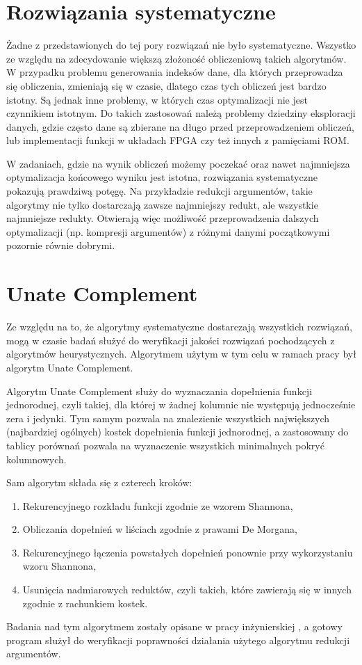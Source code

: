 \section{Rozwiązania systematyczne}

Żadne z przedstawionych do tej pory rozwiązań nie było systematyczne.
Wszystko ze względu na zdecydowanie większą złożoność obliczeniową takich algorytmów.
W przypadku problemu generowania indeksów dane,
dla których przeprowadza się obliczenia,
zmieniają się w czasie,
dlatego czas tych obliczeń jest bardzo istotny.
Są jednak inne problemy,
w których czas optymalizacji nie jest czynnikiem istotnym.
Do takich zastosowań należą problemy dziedziny eksploracji danych,
gdzie często dane są zbierane na długo przed przeprowadzeniem obliczeń,
lub implementacji funkcji w układach FPGA czy też innych z pamięciami ROM.

W zadaniach, gdzie na wynik obliczeń możemy poczekać oraz nawet najmniejsza optymalizacja końcowego wyniku jest istotna,
rozwiązania systematyczne pokazują prawdziwą potęgę.
Na przykładzie redukcji argumentów,
takie algorytmy nie tylko dostarczają zawsze najmniejszy redukt,
ale wszystkie najmniejsze redukty.
Otwierają więc możliwość przeprowadzenia dalszych optymalizacji (np. kompresji argumentów) z różnymi danymi początkowymi pozornie równie dobrymi.

\section{Unate Complement}

Ze względu na to,
że algorytmy systematyczne dostarczają wszystkich rozwiązań,
mogą w czasie badań służyć do weryfikacji jakości rozwiązań pochodzących z algorytmów heurystycznych.
Algorytmem użytym w tym celu w ramach pracy był algorytm Unate Complement.

Algorytm Unate Complement służy do wyznaczania dopełnienia funkcji jednorodnej,
czyli takiej,
dla której w żadnej kolumnie nie występują jednocześnie zera i jedynki.
Tym samym pozwala na znalezienie wszystkich największych (najbardziej ogólnych) kostek dopełnienia funkcji jednorodnej,
a zastosowany do tablicy porównań pozwala na wyznaczenie wszystkich minimalnych pokryć kolumnowych.

Sam algorytm składa się z czterech kroków:
\begin{enumerate}
\item Rekurencyjnego rozkładu funkcji zgodnie ze wzorem Shannona,
\item Obliczania dopełnień w liściach zgodnie z prawami De Morgana,
\item Rekurencyjnego łączenia powstałych dopełnień ponownie przy wykorzystaniu wzoru Shannona,
\item Usunięcia nadmiarowych reduktów,
czyli takich,
które zawierają się w innych zgodnie z rachunkiem kostek.
\end{enumerate}
Badania nad tym algorytmem zostały opisane w pracy inżynierskiej \cite{inzynierka},
a gotowy program służył do weryfikacji poprawności działania użytego algorytmu redukcji argumentów.
